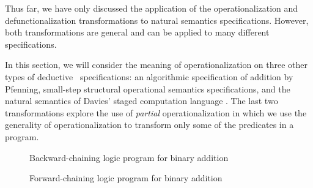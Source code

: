 Thus far, we have only discussed the application of the
operationalization and defunctionalization transformations to natural
semantics specifications. However, both transformations are general
and can be applied to many different specifications. 

In this section, we will consider the meaning of
operationalization on three other types of deductive
\sls~specifications: an algorithmic specification of addition by 
Pfenning, small-step structural operational semantics
specifications, and the natural semantics of Davies' staged computation
language \rowan. The last two transformations explore 
the use of {\it partial}
operationalization in which we use the generality of operationalization
to transform only some of the predicates in a program.






\begin{figure}
\caption{Backward-chaining logic program for binary addition}
\label{fig:plus}
\end{figure}

\begin{figure}
\caption{Forward-chaining logic program for binary addition}
\label{fig:plus-1}
\end{figure}


